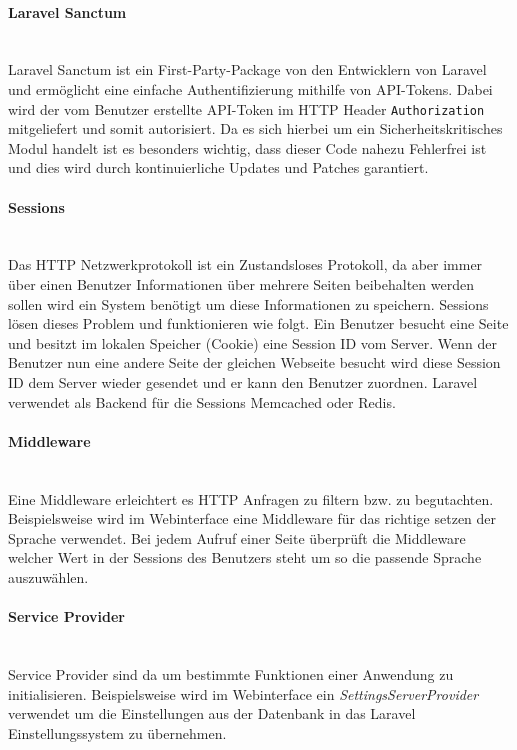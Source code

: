 \paragraph{Laravel Sanctum}\mbox{}\\
Laravel Sanctum ist ein First-Party-Package von den Entwicklern von Laravel und
ermöglicht eine einfache Authentifizierung mithilfe von API-Tokens. Dabei wird
der vom Benutzer erstellte API-Token im HTTP Header \verb|Authorization|
mitgeliefert und somit autorisiert. Da es sich hierbei um ein
Sicherheitskritisches Modul handelt ist es besonders wichtig, dass dieser Code
nahezu Fehlerfrei ist und dies wird durch kontinuierliche Updates und Patches
garantiert.
 
\paragraph{Sessions}\mbox{}\\
Das HTTP Netzwerkprotokoll ist ein Zustandsloses Protokoll, da aber immer über
einen Benutzer Informationen über mehrere Seiten beibehalten werden sollen wird
ein System benötigt um diese Informationen zu speichern. Sessions lösen dieses
Problem und funktionieren wie folgt. Ein Benutzer besucht eine Seite und besitzt
im lokalen Speicher (Cookie) eine Session ID vom Server. Wenn der Benutzer nun
eine andere Seite der gleichen Webseite besucht wird diese Session ID dem Server
wieder gesendet und er kann den Benutzer zuordnen. Laravel verwendet als Backend
für die Sessions Memcached oder Redis.

\paragraph{Middleware}\mbox{}\\
Eine Middleware erleichtert es HTTP Anfragen zu filtern bzw. zu begutachten.
Beispielsweise wird im Webinterface eine Middleware für das richtige setzen der
Sprache verwendet. Bei jedem Aufruf einer Seite überprüft die Middleware welcher
Wert in der Sessions des Benutzers steht um so die passende Sprache auszuwählen.

\paragraph{Service Provider}\mbox{}\\
Service Provider sind da um bestimmte Funktionen einer Anwendung zu
initialisieren. Beispielsweise wird im Webinterface ein
\textit{SettingsServerProvider} verwendet um die Einstellungen aus der Datenbank
in das Laravel Einstellungssystem zu übernehmen.

